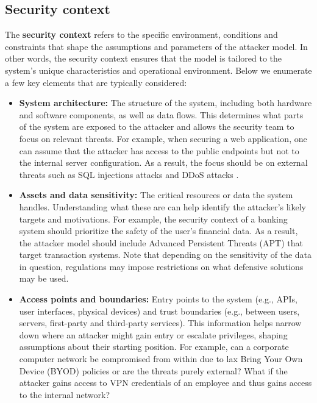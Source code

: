 \subsection{Security context}

The \textbf{security context} refers to the specific environment, conditions
and constraints that shape the assumptions and parameters of the attacker model.
In other words, the security context ensures that the model is tailored to the
system's unique characteristics and operational environment. Below we enumerate
a few key elements that are typically considered:

\begin{itemize}
    \item \textbf{System architecture:} The structure of the system, including
          both hardware and software components, as well as data flows. This
          determines what parts of the system are exposed to the attacker and
          allows the security team to focus on relevant threats. For example,
          when securing a web application, one can assume that the attacker has
          access to the public endpoints but not to the internal server
          configuration. As a result, the focus should be on external threats
          such as SQL injections attacks \cite{clarke2009sql} and DDoS attacks
          \cite{ramesh2023hybrid}.

    \item \textbf{Assets and data sensitivity:} The critical resources or data
          the system handles. Understanding what these are can help identify the
          attacker's likely targets and motivations. For example, the security
          context of a banking system should prioritize the safety of the user's
          financial data. As a result, the attacker model should include
          Advanced Persistent Threats (APT) \cite{alshamrani2019survey} that
          target transaction systems. Note that depending on the sensitivity of
          the data in question, regulations may impose restrictions on what
          defensive solutions may be used.

    \item \textbf{Access points and boundaries:} Entry points to the system
          (e.g., APIs, user interfaces, physical devices) and trust boundaries
          (e.g., between users, servers, first-party and third-party services).
          This information helps narrow down where an attacker might gain entry
          or escalate privileges, shaping assumptions about their starting
          position. For example, can a corporate computer network be compromised
          from within due to lax Bring Your Own Device (BYOD) policies
          \cite{alotaibi2018review} or are the threats purely external? What if
          the attacker gains access to VPN credentials of an employee and thus
          gains access to the internal network?
\end{itemize}
